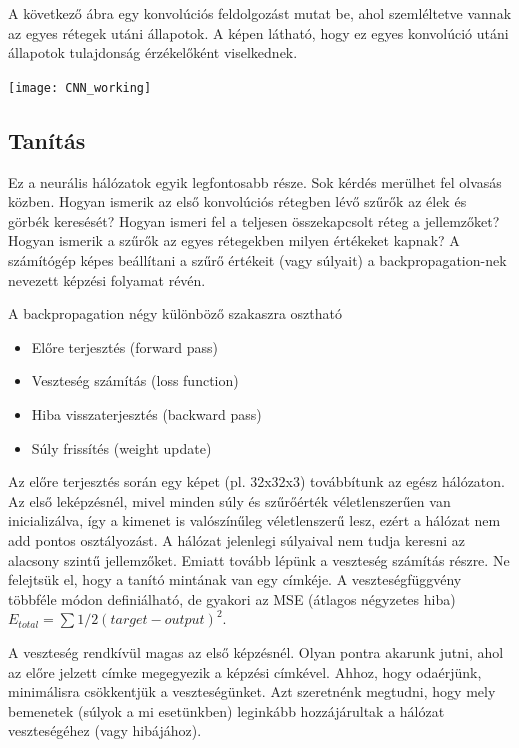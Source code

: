A következő ábra egy konvolúciós feldolgozást mutat be, ahol szemléltetve vannak az egyes rétegek utáni állapotok. A képen látható, hogy ez egyes konvolúció utáni állapotok tulajdonság érzékelőként viselkednek.

\begin{center}
\texttt{[image: CNN\_working]}
\end{center}

\subsection{Tanítás}

Ez a neurális hálózatok egyik legfontosabb része. Sok kérdés merülhet fel olvasás közben. Hogyan ismerik az első konvolúciós rétegben lévő szűrők az élek és görbék keresését? Hogyan ismeri fel a teljesen összekapcsolt réteg a jellemzőket? Hogyan ismerik a szűrők az egyes rétegekben milyen értékeket kapnak? A számítógép képes beállítani a szűrő értékeit (vagy súlyait) a backpropagation-nek nevezett képzési folyamat révén.

A backpropagation négy különböző szakaszra osztható
\begin{itemize}
\item Előre terjesztés (forward pass)
\item Veszteség számítás (loss function)
\item Hiba visszaterjesztés (backward pass)
\item Súly frissítés (weight update)
\end{itemize}

Az előre terjesztés során egy képet (pl. 32x32x3) továbbítunk az egész hálózaton. Az első leképzésnél, mivel minden súly és szűrőérték véletlenszerűen van inicializálva, így a kimenet is valószínűleg véletlenszerű lesz, ezért a hálózat nem add pontos osztályozást. A hálózat jelenlegi súlyaival nem tudja keresni az alacsony szintű jellemzőket. Emiatt tovább lépünk a veszteség számítás részre. Ne felejtsük el, hogy a tanító mintának van egy címkéje. A veszteségfüggvény többféle módon definiálható, de gyakori az MSE (átlagos négyzetes hiba) \(E_{total} = \sum 1/2(target - output)^2\).

A veszteség rendkívül magas az első képzésnél. Olyan pontra akarunk jutni, ahol az előre jelzett címke megegyezik a képzési címkével. Ahhoz, hogy odaérjünk, minimálisra csökkentjük a veszteségünket. Azt szeretnénk megtudni, hogy mely bemenetek (súlyok a mi esetünkben) leginkább hozzájárultak a hálózat veszteségéhez (vagy hibájához).

